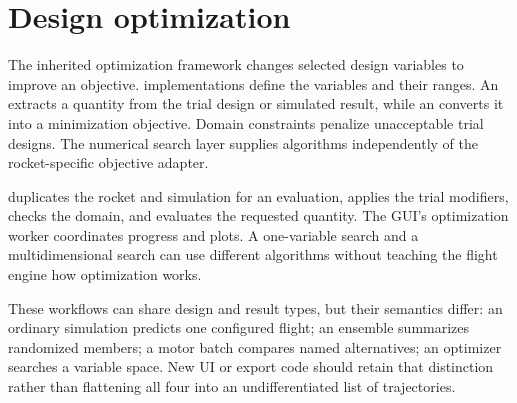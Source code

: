 
\section{Design optimization}
The inherited optimization framework changes selected design variables to improve an objective.  implementations define the variables and their ranges. An  extracts a quantity from the trial design or simulated result, while an  converts it into a minimization objective. Domain constraints penalize unacceptable trial designs. The numerical search layer supplies algorithms independently of the rocket-specific objective adapter.

 duplicates the rocket and simulation for an evaluation, applies the trial modifiers, checks the domain, and evaluates the requested quantity. The GUI's optimization worker coordinates progress and plots. A one-variable search and a multidimensional search can use different algorithms without teaching the flight engine how optimization works.

These workflows can share design and result types, but their semantics differ: an ordinary simulation predicts one configured flight; an ensemble summarizes randomized members; a motor batch compares named alternatives; an optimizer searches a variable space. New UI or export code should retain that distinction rather than flattening all four into an undifferentiated list of trajectories.


